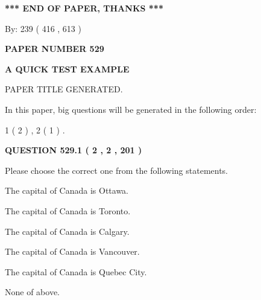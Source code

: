 \documentclass[12pt]{article}
\begin{document}
   
   
   
\vspace{1.0in} 
{\textbf{\large{ *** END OF PAPER, THANKS *** }}} 
   
   
\hspace{1.0in} By: 
 239 ( 416 ,  613 )
   
   
   
   
\newpage 
\setcounter{page}{ 
   529001 } 
   
   
   
   
 {\textbf{ \Large{ PAPER NUMBER  529  }}}
   
   
\vspace{0.2in}
   
   
   
   
   
   
   
   
 \vspace{0.2in}
{\LARGE {\textbf{ A QUICK TEST EXAMPLE}}}
   
   
 PAPER TITLE GENERATED.
   
   
   
\vspace{0.2in}
   
In this paper, big questions will be generated in the following order: 
   
   
   1 ( 2 )
 ,
   2 ( 1 )
 .
  
\vspace{0.2in}
  
{\textbf{\Large{QUESTION
529.1 
 ( 2 , 2 , 201 )
}}}
  
  
Please choose the correct one from the following statements.
 
 
The capital of Canada is Ottawa.
 
 
The capital of Canada is Toronto.
 
 
The capital of Canada is Calgary.
 
 
The capital of Canada is Vancouver.
 
 
The capital of Canada is Quebec City.
 
 
 None of above.
 
 
\noindent{}
 
\end{document}
